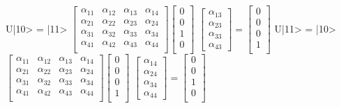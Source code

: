 \documentclass{article}
\begin{document}
\vspace{0.2cm}\newline
U|10> = |11>  \Rightarrow $\begin{bmatrix}
    \alpha_{11} & \alpha_{12} & \alpha_{13} &\alpha_{14}\\
    \alpha_{21} & \alpha_{22} & \alpha_{23} &\alpha_{24}\\
    \alpha_{31} & \alpha_{32} & \alpha_{33} &\alpha_{34}\\
    \alpha_{41} & \alpha_{42} & \alpha_{43} &\alpha_{44}\\
\end{bmatrix}\begin{bmatrix}
    0\\
    0\\
    1\\
    0\\
\end{bmatrix}$ \Rightarrow $\begin{bmatrix}
    \alpha_{13}\\
    \alpha_{23}\\
    \alpha_{33}\\
    \alpha_{43}
\end{bmatrix} = \begin{bmatrix}
    0\\
    0\\
    0\\
    1\\
\end{bmatrix}$
\vspace{0.2cm}\newline
U|11> = |10>  \Rightarrow $\begin{bmatrix}
    \alpha_{11} & \alpha_{12} & \alpha_{13} &\alpha_{14}\\
    \alpha_{21} & \alpha_{22} & \alpha_{23} &\alpha_{24}\\
    \alpha_{31} & \alpha_{32} & \alpha_{33} &\alpha_{34}\\
    \alpha_{41} & \alpha_{42} & \alpha_{43} &\alpha_{44}\\
\end{bmatrix}\begin{bmatrix}
    0\\
    0\\
    0\\
    1\\
\end{bmatrix}$ \Rightarrow $\begin{bmatrix}
    \alpha_{14}\\
    \alpha_{24}\\
    \alpha_{34}\\
    \alpha_{44}
\end{bmatrix} = \begin{bmatrix}
    0\\
    0\\
    1\\
    0\\
\end{bmatrix}$
\end{document}
